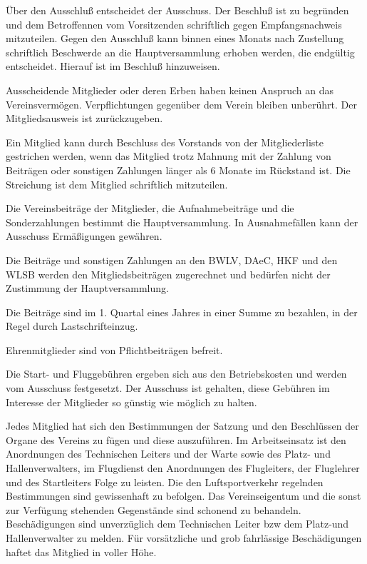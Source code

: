 \documentclass[10pt,a4paper,parskip=half]{scrartcl}
\begin{document}
\begin{contract}
    Über den Ausschluß entscheidet der Ausschuss.
    Der Beschluß ist zu begründen und dem Betroffennen vom Vorsitzenden schriftlich gegen Empfangsnachweis mitzuteilen.
    Gegen den Ausschluß kann binnen eines Monats nach Zustellung schriftlich Beschwerde an die
    Hauptversammlung erhoben werden,
    die endgültig entscheidet.
    Hierauf ist im Beschluß hinzuweisen.
    
    Ausscheidende Mitglieder oder deren Erben haben keinen Anspruch an das Vereinsvermögen.
    Verpflichtungen gegenüber dem Verein bleiben unberührt.
    Der Mitgliedsausweis ist zurückzugeben.

    Ein Mitglied kann durch Beschluss des Vorstands von der Mitgliederliste gestrichen werden,
    wenn das Mitglied trotz Mahnung mit der Zahlung von Beiträgen oder sonstigen Zahlungen länger als 6 Monate im Rückstand ist.
    Die Streichung ist dem Mitglied schriftlich mitzuteilen.
    
    Die Vereinsbeiträge der Mitglieder,
    die Aufnahmebeiträge und die Sonderzahlungen bestimmt die Hauptversammlung.
    In Ausnahmefällen kann der Ausschuss Ermäßigungen gewähren.
    
    Die Beiträge und sonstigen Zahlungen an den BWLV,
    DAeC,
    HKF und den WLSB werden den Mitgliedsbeiträgen zugerechnet und bedürfen nicht der Zustimmung der Hauptversammlung.
    
    Die Beiträge sind im 1. Quartal eines Jahres in einer Summe zu bezahlen,
    in der Regel durch Lastschrifteinzug.
    
    Ehrenmitglieder sind von Pflichtbeiträgen befreit.
    
    Die Start- und Fluggebühren ergeben sich aus den Betriebskosten und werden vom Ausschuss festgesetzt.
    Der Ausschuss ist gehalten,
    diese Gebühren im Interesse der Mitglieder so günstig wie möglich zu halten.
    
    
    Jedes Mitglied hat sich den Bestimmungen der Satzung und den Beschlüssen der Organe des Vereins zu fügen und diese auszuführen.
    Im Arbeitseinsatz ist den Anordnungen des Technischen Leiters und der Warte sowie des Platz- und Hallenverwalters,
    im Flugdienst den Anordnungen des Flugleiters,
    der Fluglehrer und des Startleiters Folge zu leisten.
    Die den Luftsportverkehr regelnden Bestimmungen sind gewissenhaft zu befolgen.
    Das Vereinseigentum und die sonst zur Verfügung stehenden Gegenstände sind schonend zu behandeln.
    Beschädigungen sind unverzüglich dem Technischen Leiter bzw dem Platz-und Hallenverwalter zu melden.
    Für vorsätzliche und grob fahrlässige Beschädigungen haftet das Mitglied in voller Höhe.
    

\end{contract}
\end{document}
